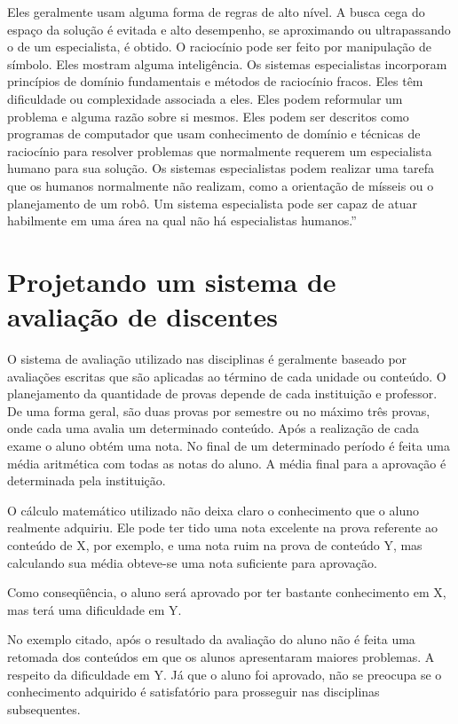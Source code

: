 \documentclass{article}
\begin{document}
Eles geralmente usam alguma forma de regras de alto nível. A
busca cega do espaço da solução é evitada e alto desempenho,
se aproximando ou ultrapassando o de um especialista, é
obtido. O raciocínio pode ser feito por manipulação de
símbolo. Eles mostram alguma inteligência. Os sistemas
especialistas incorporam princípios de domínio fundamentais
e métodos de raciocínio fracos. Eles têm dificuldade ou
complexidade associada a eles. Eles podem reformular um
problema e alguma razão sobre si mesmos. Eles podem ser
descritos como programas de computador que usam conhecimento de
domínio e técnicas de raciocínio para resolver problemas que
normalmente requerem um especialista humano para sua solução.
Os sistemas especialistas podem realizar uma tarefa que os
humanos normalmente não realizam, como a orientação de
mísseis ou o planejamento de um robô. Um sistema especialista
pode ser capaz de atuar habilmente em uma área na qual não há
especialistas humanos.''\citep{kandel1992fuzzy}

\section{Projetando um sistema de avaliação de discentes}

O sistema de avaliação utilizado nas disciplinas é geralmente 
baseado por avaliações escritas que são aplicadas ao término 
de cada unidade ou conteúdo. O planejamento da quantidade 
de provas depende de cada instituição e professor. De uma 
forma geral, são duas provas por semestre ou no máximo três 
provas, onde cada uma avalia um determinado conteúdo. Após a 
realização de cada exame o aluno obtém uma nota. No final de 
um determinado período é feita uma média aritmética com
todas as notas do aluno. A média final para a aprovação é
determinada pela instituição.

O cálculo matemático utilizado não deixa claro o conhecimento
que o aluno realmente adquiriu. Ele pode ter tido uma nota
excelente na prova referente ao conteúdo de X, por
exemplo, e uma nota ruim na prova de conteúdo Y, mas 
calculando sua média obteve-se uma nota suficiente para aprovação.

Como conseqüência, o aluno será aprovado por ter bastante
conhecimento em X, mas terá uma dificuldade em Y.

No exemplo citado, após o resultado da avaliação do aluno
não é feita uma retomada dos conteúdos em que os alunos
apresentaram maiores problemas. A respeito
da dificuldade em Y. Já que o aluno foi aprovado, não 
se preocupa se o conhecimento adquirido é satisfatório 
para prosseguir nas disciplinas subsequentes.
\end{document}
